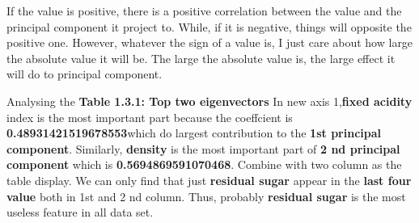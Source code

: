\documentclass[titlepage,a4paper,12pt,thmsb]{report}
\begin{document}
If the value is positive, there is a positive correlation between the value and the principal component it project to. While, if it is negative, things will opposite the positive one. However, whatever the sign of a value is, I just care about how large the absolute value it will be.  The large the absolute value is, the large effect it will do to principal component.


\begin{center}
{}
{}
\end{center}

\newpage
Analysing the {\bf{Table 1.3.1: Top two eigenvectors}} In new axis 1,{\bf fixed acidity} index is the most important part because the coeffcient is {\bf 0.48931421519678553}which do largest contribution to the {\bf 1st principal component}. Similarly, {\bf density} is the most important part of {\bf 2 nd principal component} which is {\bf 0.5694869591070468}.
Combine with two column as the table display. We can only find that just {\bf residual sugar} appear in the {\bf last four value} both in 1st and 2 nd column. Thus, probably {\bf residual sugar} is the most useless feature in all data set.
\end{document}
